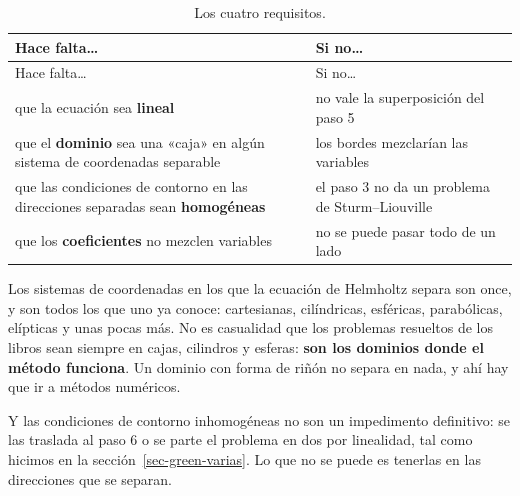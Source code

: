 \documentclass[
  spanish,
  a4paper,
]{scrbook}
\theoremstyle{definition}
\theoremstyle{plain}
\theoremstyle{definition}
\theoremstyle{plain}
\theoremstyle{definition}
\theoremstyle{remark}
\begin{document}
\begin{longtable}[]{@{}
  >{\raggedright\arraybackslash}p{}
  >{\raggedright\arraybackslash}p{}@{}}
\caption{Los cuatro requisitos.}\label{tbl-separacion}\tabularnewline
\toprule\noalign{}
\begin{minipage}[b]{\linewidth}\raggedright
Hace falta\ldots{}
\end{minipage} & \begin{minipage}[b]{\linewidth}\raggedright
Si no\ldots{}
\end{minipage} \\
\midrule\noalign{}
\endfirsthead
\toprule\noalign{}
\begin{minipage}[b]{\linewidth}\raggedright
Hace falta\ldots{}
\end{minipage} & \begin{minipage}[b]{\linewidth}\raggedright
Si no\ldots{}
\end{minipage} \\
\midrule\noalign{}
\endhead
\bottomrule\noalign{}
\endlastfoot
que la ecuación sea \textbf{lineal} & no vale la superposición del paso
5 \\
que el \textbf{dominio} sea una «caja» en algún sistema de coordenadas
separable & los bordes mezclarían las variables \\
que las condiciones de contorno en las direcciones separadas sean
\textbf{homogéneas} & el paso 3 no da un problema de Sturm--Liouville \\
que los \textbf{coeficientes} no mezclen variables & no se puede pasar
todo de un lado \\
\end{longtable}

Los sistemas de coordenadas en los que la ecuación de Helmholtz separa
son once, y son todos los que uno ya conoce: cartesianas, cilíndricas,
esféricas, parabólicas, elípticas y unas pocas más. No es casualidad que
los problemas resueltos de los libros sean siempre en cajas, cilindros y
esferas: \textbf{son los dominios donde el método funciona}. Un dominio
con forma de riñón no separa en nada, y ahí hay que ir a métodos
numéricos.

Y las condiciones de contorno inhomogéneas no son un impedimento
definitivo: se las traslada al paso 6 o se parte el problema en dos por
linealidad, tal como hicimos en la sección~\ref{sec-green-varias}. Lo
que no se puede es tenerlas en las direcciones que se separan.
\end{document}
